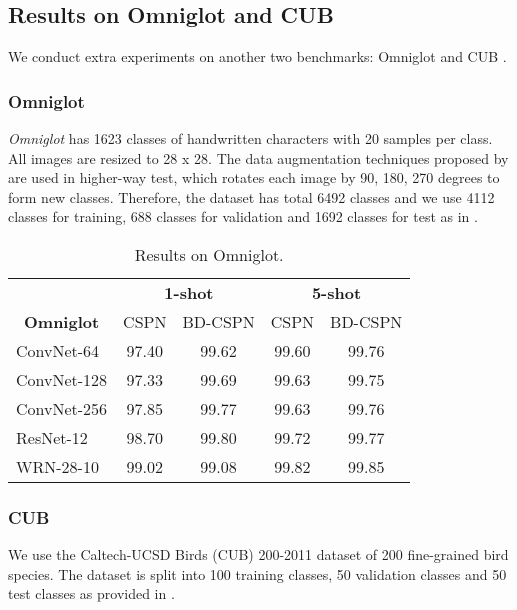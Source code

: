 \documentclass[runningheads]{llncs}
\begin{document}
\subsection{Results on Omniglot and CUB}
We conduct extra experiments on another two benchmarks: Omniglot \cite{lake2011one} and CUB \cite{wah2011the}.

\subsubsection{Omniglot}

\textit{Omniglot} has 1623 classes of handwritten characters with 20 samples per class. All images are resized to 28 x 28. The data augmentation techniques proposed by \cite{santoro2016meta,snell2017prototypical} are used in higher-way test, which rotates each image by 90, 180, 270 degrees to form new classes. Therefore, the dataset has total 6492 classes and we use 4112 classes for training, 688 classes for validation and 1692 classes for test as in \cite{snell2017prototypical}.


\begin{table}
\centering
\caption{Results on Omniglot.}
\begin{tabular}{lcccc}
\toprule
\multicolumn{1}{c}{{ }}& \multicolumn{2}{c}{{ \textbf{1-shot}}} & \multicolumn{2}{c}{{\textbf{5-shot}}} \\
\multicolumn{1}{c}{\multirow{-2}{*}{{ \textbf{Omniglot}}}} & {CSPN}  & {BD-CSPN} & {CSPN}  & {BD-CSPN} \\ \midrule
{ConvNet-64} & {97.40} & {99.62}   & {99.60} & {99.76}   \\
{ConvNet-128}& {97.33} & {99.69}   & {99.63} & {99.75}   \\
{ConvNet-256}  & {97.85} & {99.77}   & {99.63} & {99.76}   \\
{ResNet-12} & {98.70} & {99.80}   & {99.72} & {99.77}   \\
{WRN-28-10} & {99.02} & {99.08}   & {99.82} & {99.85}  \\  \midrule
\end{tabular}
\end{table}


\subsubsection{CUB}

We use the Caltech-UCSD Birds (CUB) 200-2011 dataset \cite{wah2011the} of 200 fine-grained bird species. The dataset is split into 100 training classes, 50 validation classes and 50 test classes as provided in \cite{chen2019a}. 
\end{document}

